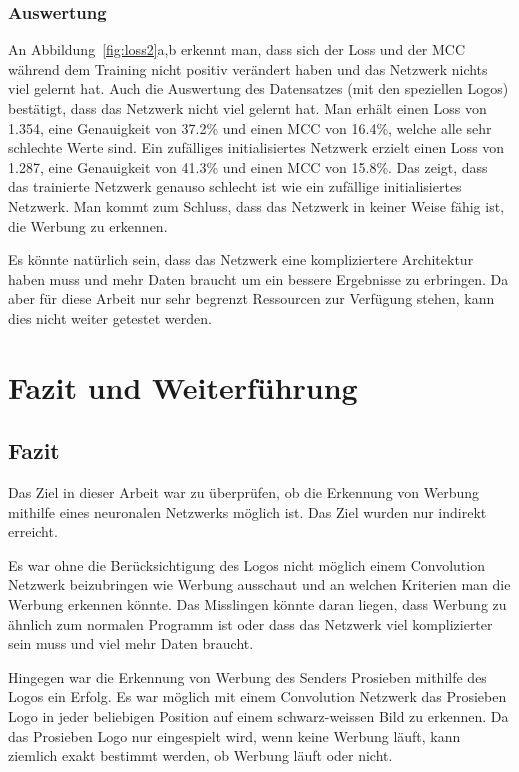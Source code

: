 \documentclass[12pt,a4paper]{report}
\begin{document}
\subsection{Auswertung}
An Abbildung~\ref{fig:loss2}a,b erkennt man,
dass sich der Loss und der MCC während dem Training nicht positiv verändert haben und das Netzwerk nichts viel gelernt hat.
Auch die Auswertung des Datensatzes (mit den speziellen Logos) bestätigt, dass das Netzwerk nicht viel gelernt hat.
Man erhält einen Loss von 1.354, eine Genauigkeit von 37.2\% und einen MCC von 16.4\%, welche alle sehr schlechte Werte sind.
Ein zufälliges initialisiertes Netzwerk  erzielt einen Loss von 1.287, eine Genauigkeit von 41.3\% und einen MCC von 15.8\%.
Das zeigt, dass das trainierte Netzwerk genauso schlecht ist wie ein zufällige initialisiertes Netzwerk.
Man kommt zum Schluss, dass das Netzwerk in keiner Weise fähig ist, die Werbung zu erkennen.

Es könnte natürlich sein, dass das Netzwerk eine kompliziertere Architektur haben muss und mehr Daten braucht um ein bessere Ergebnisse zu erbringen.
Da aber für diese Arbeit nur sehr begrenzt Ressourcen zur Verfügung stehen, kann dies nicht weiter getestet werden.


\chapter{Fazit und Weiterführung}\label{ch:fazitUndWeiterführung}
\section{Fazit}
Das Ziel in dieser Arbeit war zu überprüfen, ob die Erkennung von Werbung mithilfe eines neuronalen Netzwerks möglich ist.
Das Ziel wurden nur indirekt erreicht.

Es war ohne die Berücksichtigung des Logos nicht möglich einem Convolution Netzwerk beizubringen wie Werbung ausschaut und an welchen Kriterien man die Werbung erkennen könnte.
Das Misslingen könnte daran liegen, dass Werbung zu ähnlich zum normalen Programm ist oder dass das Netzwerk viel komplizierter sein muss und viel mehr Daten braucht.

Hingegen war die Erkennung von Werbung des Senders Prosieben mithilfe des Logos ein Erfolg.
Es war möglich mit einem Convolution Netzwerk das Prosieben Logo in jeder beliebigen Position auf einem schwarz-weissen Bild zu erkennen.
Da das Prosieben Logo nur eingespielt wird, wenn keine Werbung läuft,
kann ziemlich exakt bestimmt werden, ob Werbung läuft oder nicht.
\end{document}
